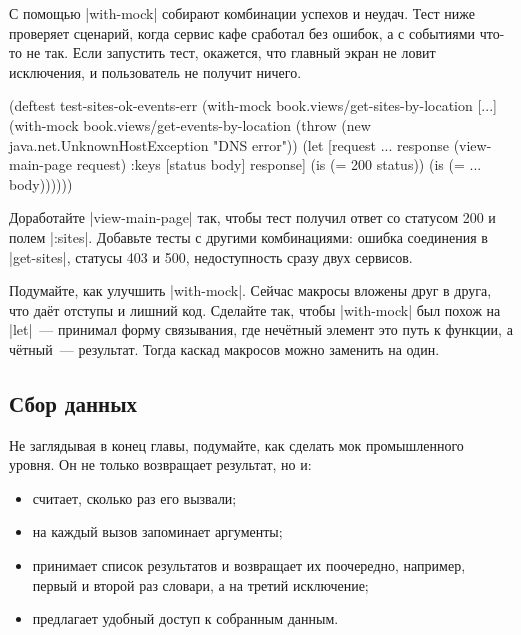 С помощью \spverb|with-mock| собирают комбинации успехов и неудач. Тест ниже
проверяет сценарий, когда сервис кафе сработал без ошибок, а с событиями что-то
не так. Если запустить тест, окажется, что главный экран не ловит исключения, и
пользователь не получит ничего.

\begin{english}
  \begin{clojure}
(deftest test-sites-ok-events-err
  (with-mock book.views/get-sites-by-location [...]
    (with-mock book.views/get-events-by-location
      (throw (new java.net.UnknownHostException "DNS error"))
      (let [request {...}
            response (view-main-page request)
            {:keys [status body]} response]
        (is (= 200 status))
        (is (= {...} body))))))
  \end{clojure}
\end{english}

Доработайте \spverb|view-main-page| так, чтобы тест получил ответ со статусом
200 и полем \spverb|:sites|. Добавьте тесты с другими комбинациями: ошибка
соединения в \spverb|get-sites|, статусы 403 и 500, недоступность сразу двух
сервисов.

Подумайте, как улучшить \spverb|with-mock|. Сейчас макросы вложены друг в друга,
что даёт отступы и лишний код. Сделайте так, чтобы \spverb|with-mock| был похож
на \spverb|let|~--- принимал форму связывания, где нечётный элемент это путь
к функции, а чётный~--- результат. Тогда каскад макросов можно заменить на
один.

\subsection{Сбор данных}


Не заглядывая в конец главы, подумайте, как сделать мок промышленного уровня. Он
не только возвращает результат, но и:

\begin{itemize}

\item
  считает, сколько раз его вызвали;

\item
  на каждый вызов запоминает аргументы;

\item
  принимает список результатов и возвращает их поочередно, например, первый и
  второй раз словари, а на третий исключение;

\item
  предлагает удобный доступ к собранным данным.

\end{itemize}

